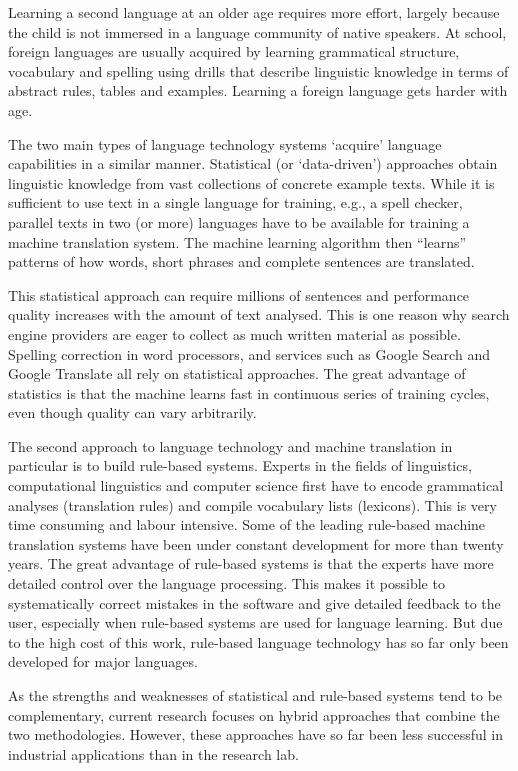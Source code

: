 \documentclass[]{../../metanetpaper}
\begin{document}
\begin{Parallel}[c]{80mm}{80mm}
{    Learning a second language at an older age requires more effort, largely because the child is not immersed in a language community of native speakers. At school, foreign languages are usually acquired by learning grammatical structure, vocabulary and spelling using drills that describe linguistic knowledge in terms of abstract rules, tables and examples. Learning a foreign language gets harder with age.

    The two main types of language technology systems ‘acquire’ language capabilities in a similar manner. Statistical (or ‘data-driven’) approaches obtain linguistic knowledge from vast collections of concrete example texts. While it is sufficient to use text in a single language for training, e.g., a spell checker, parallel texts in two (or more) languages have to be available for training a machine translation system. The machine learning algorithm then “learns” patterns of how words, short phrases and complete sentences are translated. 

    This statistical approach can require millions of sentences and performance quality increases with the amount of text analysed. This is one reason why search engine providers are eager to collect as much written material as possible. Spelling correction in word processors, and services such as Google Search and Google Translate all rely on statistical approaches. The great advantage of statistics is that the machine learns fast in continuous series of training cycles, even though quality can vary arbitrarily.

    The second approach to language technology and machine translation in particular is to build rule-based systems. Experts in the fields of linguistics, computational linguistics and computer science first have to encode grammatical analyses (translation rules) and compile vocabulary lists (lexicons). This is very time consuming and labour intensive. Some of the leading rule-based machine translation systems have been under constant development for more than twenty years. The great advantage of rule-based systems is that the experts have more detailed control over the language processing. This makes it possible to systematically correct mistakes in the software and give detailed feedback to the user, especially when rule-based systems are used for language learning. But due to the high cost of this work, rule-based language technology has so far only been developed for major languages. 

    As the strengths and weaknesses of statistical and rule-based systems tend to be complementary, current research focuses on hybrid approaches that combine the two methodologies. However, these approaches have so far been less successful in industrial applications than in the research lab. 

}
\end{Parallel}
\end{document}
